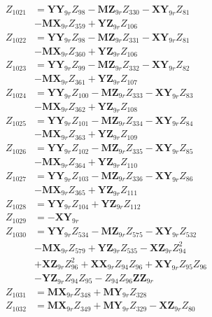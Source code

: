 \begin{multicols}{2}
\begin{align}
Z_{1021} &= \mathbf{YY}_{9r}Z_{98} - \mathbf{MZ}_{9r}Z_{330} - \mathbf{XY}_{9r}Z_{81}  \nonumber \\
&- \mathbf{MX}_{9r}Z_{359} + \mathbf{YZ}_{9r}Z_{106} \nonumber \\
Z_{1022} &= \mathbf{YY}_{9r}Z_{98} - \mathbf{MZ}_{9r}Z_{331} - \mathbf{XY}_{9r}Z_{81}  \nonumber \\
&- \mathbf{MX}_{9r}Z_{360} + \mathbf{YZ}_{9r}Z_{106} \nonumber \\
Z_{1023} &= \mathbf{YY}_{9r}Z_{99} - \mathbf{MZ}_{9r}Z_{332} - \mathbf{XY}_{9r}Z_{82}  \nonumber \\
&- \mathbf{MX}_{9r}Z_{361} + \mathbf{YZ}_{9r}Z_{107} \nonumber \\
Z_{1024} &= \mathbf{YY}_{9r}Z_{100} - \mathbf{MZ}_{9r}Z_{333} - \mathbf{XY}_{9r}Z_{83}  \nonumber \\
&- \mathbf{MX}_{9r}Z_{362} + \mathbf{YZ}_{9r}Z_{108} \nonumber \\
Z_{1025} &= \mathbf{YY}_{9r}Z_{101} - \mathbf{MZ}_{9r}Z_{334} - \mathbf{XY}_{9r}Z_{84}  \nonumber \\
&- \mathbf{MX}_{9r}Z_{363} + \mathbf{YZ}_{9r}Z_{109} \nonumber \\
Z_{1026} &= \mathbf{YY}_{9r}Z_{102} - \mathbf{MZ}_{9r}Z_{335} - \mathbf{XY}_{9r}Z_{85}  \nonumber \\
&- \mathbf{MX}_{9r}Z_{364} + \mathbf{YZ}_{9r}Z_{110} \nonumber \\
Z_{1027} &= \mathbf{YY}_{9r}Z_{103} - \mathbf{MZ}_{9r}Z_{336} - \mathbf{XY}_{9r}Z_{86}  \nonumber \\
&- \mathbf{MX}_{9r}Z_{365} + \mathbf{YZ}_{9r}Z_{111} \nonumber \\
Z_{1028} &= \mathbf{YY}_{9r}Z_{104} + \mathbf{YZ}_{9r}Z_{112} \nonumber \\
Z_{1029} &= -\mathbf{XY}_{9r} \nonumber \\
Z_{1030} &= \mathbf{YY}_{9r}Z_{534} - \mathbf{MZ}_{9r}Z_{575} - \mathbf{XY}_{9r}Z_{532}  \nonumber \\
&- \mathbf{MX}_{9r}Z_{579} + \mathbf{YZ}_{9r}Z_{535} - \mathbf{XZ}_{9r}Z_{94}^2  \nonumber \\
&+ \mathbf{XZ}_{9r}Z_{96}^2 + \mathbf{XX}_{9r}Z_{94}Z_{96} + \mathbf{XY}_{9r}Z_{95}Z_{96}  \nonumber \\
&- \mathbf{YZ}_{9r}Z_{94}Z_{95} - Z_{94}Z_{96}\mathbf{ZZ}_{9r} \nonumber \\
Z_{1031} &= \mathbf{MX}_{9r}Z_{348} + \mathbf{MY}_{9r}Z_{328} \nonumber \\
Z_{1032} &= \mathbf{MX}_{9r}Z_{349} + \mathbf{MY}_{9r}Z_{329} - \mathbf{XZ}_{9r}Z_{80}  \nonumber \\

\end{align}
\end{multicols}
